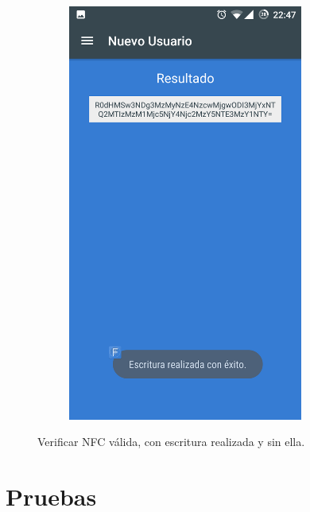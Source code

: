 \documentclass[../PFC.tex]{subfiles}
\begin{document}
\begin{figure}[H]
\begin{subfigure}{0.4\textwidth}
       \includegraphics[width=0.85\textwidth]{./img/app/escrituraPostLectura}
    \end{subfigure}   
  \caption{Verificar NFC válida, con escritura realizada y sin ella.}
  \label{img:app:verificarNFC2}
\end{figure}

\section{Pruebas}
\label{App:Pruebas}
\end{document}
